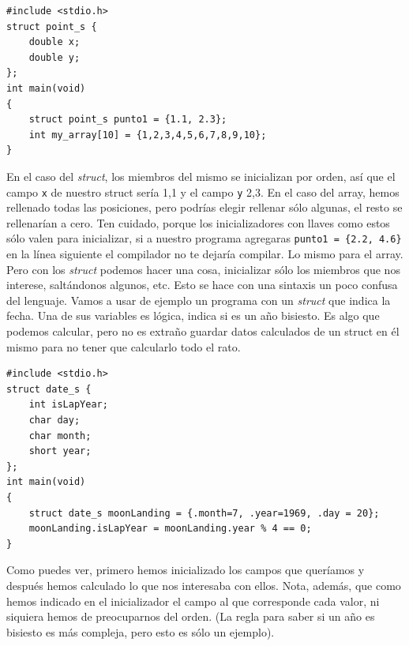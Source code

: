 \documentclass[a4paper]{article}
\begin{document}
\noindent
\begin{minipage}[H]{\linewidth}
\mbox{}
\begin{lstlisting}[style=C,
caption={Inicialización con llaves},
label={lst:initializationLists}]
#include <stdio.h>
struct point_s {
    double x;
    double y;
};
int main(void)
{
    struct point_s punto1 = {1.1, 2.3};
    int my_array[10] = {1,2,3,4,5,6,7,8,9,10};
}
\end{lstlisting}
\end{minipage}


En el caso del \textit{struct}, los miembros del mismo se inicializan por orden,
así que el campo \verb!x! de nuestro struct sería 1,1 y el campo \verb!y!
2,3. En el
caso del array, hemos rellenado todas las posiciones, pero podrías elegir
rellenar sólo algunas, el resto se rellenarían a cero. Ten cuidado, porque los
inicializadores con llaves como estos sólo valen para inicializar, si a nuestro
programa agregaras \lstinline[style=C]!punto1 = {2.2, 4.6}! en la línea
siguiente el compilador no te dejaría compilar. Lo mismo para el array.
Pero con los \textit{struct} podemos hacer una cosa, inicializar sólo los
miembros que nos interese, saltándonos algunos, etc. Esto se hace con una
sintaxis un poco confusa del lenguaje. Vamos a usar de ejemplo un programa con
un \textit{struct} que indica la fecha. Una de sus variables es lógica, indica
si es un año bisiesto. Es algo que podemos calcular, pero no es extraño guardar
datos calculados de un struct en él mismo para no tener que calcularlo todo el
rato.


\noindent
\begin{minipage}[H]{\linewidth}
\mbox{}
\begin{lstlisting}[style=C,
caption={Inicialización con llaves de struct con selección de campos},
label={lst:dateStruct}]
#include <stdio.h>
struct date_s {
    int isLapYear;
    char day;
    char month;
    short year;
};
int main(void)
{
    struct date_s moonLanding = {.month=7, .year=1969, .day = 20};
    moonLanding.isLapYear = moonLanding.year % 4 == 0;
}
\end{lstlisting}
\end{minipage}


Como puedes ver, primero hemos inicializado los campos que queríamos y después
hemos calculado lo que nos interesaba con ellos. Nota, además, que como hemos
indicado en el inicializador el campo al que corresponde cada valor, ni siquiera
hemos de preocuparnos del orden.
(La regla para saber si un año
es bisiesto es más compleja, pero esto es sólo un ejemplo).
\end{document}
